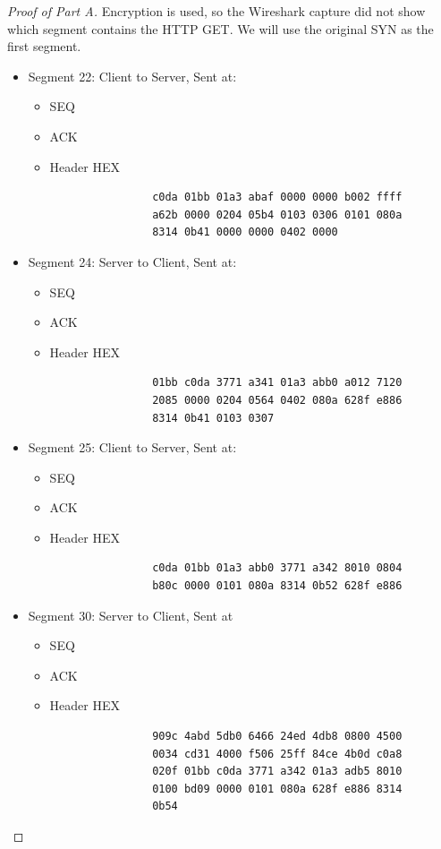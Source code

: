 \documentclass[../main.tex]{subfiles}
\begin{document}
\begin{proof}[Proof of Part A]
Encryption is used, so the Wireshark capture did not show which segment contains the HTTP GET. We will use the original SYN as the first segment.
\begin{itemize}
    \item Segment 22: Client to Server, Sent at: 
    	\begin{itemize}
    		\item SEQ  	
    		\item ACK 
    		\item Header HEX
    		\begin{lstlisting}
    	        c0da 01bb 01a3 abaf 0000 0000 b002 ffff
            	a62b 0000 0204 05b4 0103 0306 0101 080a
    	        8314 0b41 0000 0000 0402 0000\end{lstlisting}
    	\end{itemize}
            
    \item Segment 24: Server to Client, Sent at: 
    	\begin{itemize}
    		\item SEQ 
    		\item ACK 
    		\item Header HEX
            \begin{lstlisting}
            	01bb c0da 3771 a341 01a3 abb0 a012 7120
            	2085 0000 0204 0564 0402 080a 628f e886
            	8314 0b41 0103 0307\end{lstlisting}
    	\end{itemize}
    
    \item Segment 25: Client to Server, Sent at: 
    	\begin{itemize}
    		\item SEQ 
    		\item ACK 
    		\item Header HEX
    		\begin{lstlisting}
    			c0da 01bb 01a3 abb0 3771 a342 8010 0804
    			b80c 0000 0101 080a 8314 0b52 628f e886\end{lstlisting}
    	\end{itemize}
    
    \item Segment 30: Server to Client, Sent at 
    	\begin{itemize}
    		\item SEQ 
    		\item ACK 
    		\item Header HEX
    		\begin{lstlisting}
    			909c 4abd 5db0 6466 24ed 4db8 0800 4500
    			0034 cd31 4000 f506 25ff 84ce 4b0d c0a8
    			020f 01bb c0da 3771 a342 01a3 adb5 8010
    			0100 bd09 0000 0101 080a 628f e886 8314
    			0b54\end{lstlisting}
    	\end{itemize}
    \end{itemize}
\end{proof}
\end{document}
